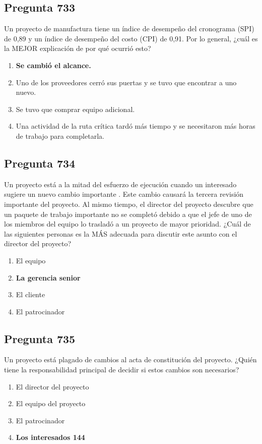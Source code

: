 \documentclass[11pt,a4paper]{article}
\begin{document}
\subsection*{Pregunta 733}
Un proyecto de manufactura tiene un índice de desempeño del cronograma (SPI) de 0,89 y un índice de desempeño del costo (CPI) de 0,91. Por lo general, ¿cuál es la MEJOR explicación de por qué ocurrió esto?

\begin{enumerate}[label=\alph*)]
  \item \textbf{Se cambió el alcance.}
  \item Uno de los proveedores cerró sus puertas y se tuvo que encontrar a uno nuevo.
  \item Se tuvo que comprar equipo adicional.
  \item Una actividad de la ruta crítica tardó más tiempo y se necesitaron más horas de trabajo para completarla.
\end{enumerate}

\subsection*{Pregunta 734}
Un proyecto está a la mitad del esfuerzo de ejecución cuando un interesado sugiere un nuevo cambio importante . Este cambio causará la tercera revisión importante del proyecto. Al mismo tiempo, el director del proyecto descubre que un paquete de trabajo importante no se completó debido a que el jefe de uno de los miembros del equipo lo trasladó a un proyecto de mayor prioridad. ¿Cuál de las siguientes personas es la MÁS adecuada para discutir este asunto con el director del proyecto?

\begin{enumerate}[label=\alph*)]
  \item El equipo
  \item \textbf{La gerencia senior}
  \item El cliente
  \item El patrocinador
\end{enumerate}

\subsection*{Pregunta 735}
Un proyecto está plagado de cambios al acta de constitución del proyecto. ¿Quién tiene la responsabilidad principal de decidir si estos cambios son necesarios?

\begin{enumerate}[label=\alph*)]
  \item El director del proyecto
  \item El equipo del proyecto
  \item El patrocinador
  \item \textbf{Los interesados 144}
\end{enumerate}
\end{document}
